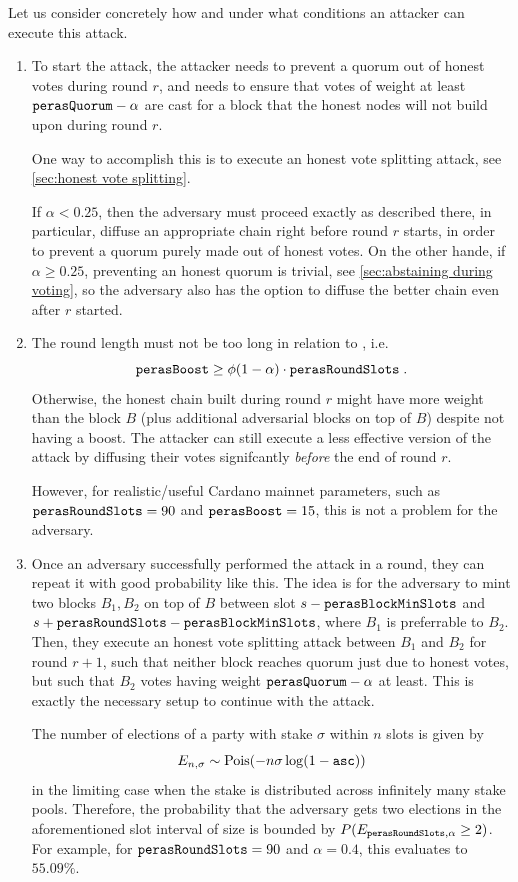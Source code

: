 \medskip
Let us consider concretely how and under what conditions an attacker can execute this attack.
\begin{enumerate}
\item
  To start the attack, the attacker needs to prevent a quorum out of honest votes during round $r$, and needs to ensure that votes of weight at least $\mathtt{perasQuorum} - \alpha$ are cast for a block that the honest nodes will not build upon during round $r$.

  One way to accomplish this is to execute an honest vote splitting attack, see \cref{sec:honest vote splitting}.

  If $\alpha<0.25$, then the adversary must proceed exactly as described there, in particular, diffuse an appropriate chain right before round $r$ starts, in order to prevent a quorum purely made out of honest votes.
  On the other hande, if $\alpha\ge 0.25$, preventing an honest quorum is trivial, see \cref{sec:abstaining during voting}, so the adversary also has the option to diffuse the better chain even after $r$ started.
\item
  The round length \perasRoundSlots{} must not be too long in relation to \perasBoost{}, i.e.
  \[ \mathtt{perasBoost} \ge \phi(1-\alpha)\cdot \mathtt{perasRoundSlots} \;. \]
  Otherwise, the honest chain built during round $r$ might have more weight than the block $B$ (plus additional adversarial blocks on top of $B$) despite not having a boost.
  The attacker can still execute a less effective version of the attack by diffusing their votes signifcantly \emph{before} the end of round $r$.

  However, for realistic/useful Cardano mainnet parameters, such as $\mathtt{perasRoundSlots} = 90$ and $\mathtt{perasBoost} = 15$, this is not a problem for the adversary.
\item
  Once an adversary successfully performed the attack in a round, they can repeat it with good probability like this.
  The idea is for the adversary to mint two blocks $B_1,B_2$ on top of $B$ between slot $s-\mathtt{perasBlockMinSlots}$ and $s+\mathtt{perasRoundSlots} -\mathtt{perasBlockMinSlots}$, where $B_1$ is preferrable to $B_2$.
  Then, they execute an honest vote splitting attack between $B_1$ and $B_2$ for round $r+1$, such that neither block reaches quorum just due to honest votes, but such that $B_2$ votes having weight $\mathtt{perasQuorum} - \alpha$ at least.
  This is exactly the necessary setup to continue with the attack.

  The number of elections of a party with stake $\sigma$ within $n$ slots is given by
  \[ E_{n,\sigma}\sim\operatorname{Pois}(-n\sigma\log(1-\mathtt{asc})) \]
  in the limiting case when the stake is distributed across infinitely many stake pools.
  Therefore, the probability that the adversary gets two elections in the aforementioned slot interval of size \perasRoundSlots{} is bounded by $P(E_{\mathtt{perasRoundSlots},\alpha}\ge 2)$.
  For example, for $\mathtt{perasRoundSlots} = 90$ and $\alpha=0.4$, this evaluates to $55.09\%$.


\end{enumerate}
